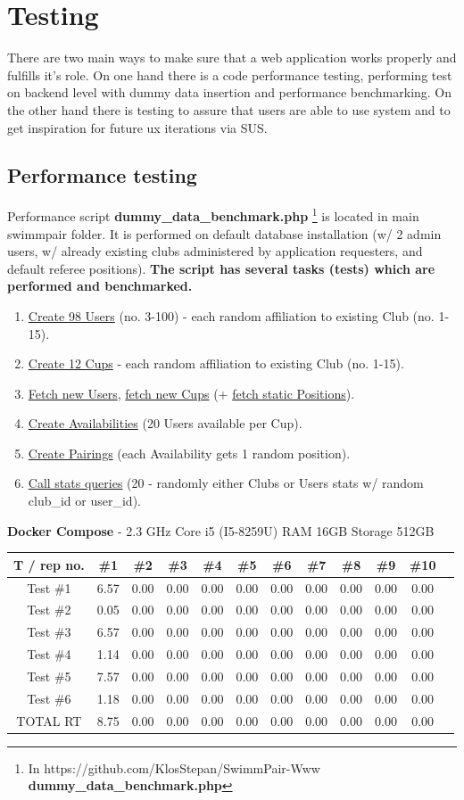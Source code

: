 \chapter{Testing}
There are two main ways to make sure that a web application works properly and fulfills it's role. On one hand there is a code performance testing, performing test on backend level with dummy data insertion and performance benchmarking. On the other hand there is testing to assure that users are able to use system and to get inspiration for future ux iterations via SUS.
\section{Performance testing}
Performance script \textbf{dummy\_data\_benchmark.php} \footnote{In https://github.com/KlosStepan/SwimmPair-Www \textbf{dummy\_data\_benchmark.php}} is located in main swimmpair folder. It is performed on default database installation (w/ 2 admin users, w/ already existing clubs administered by application requesters, and default referee positions).  
\newline
\textbf{The script has several tasks (tests) which are performed and benchmarked.}
\begin{enumerate}
    \item \underline{Create 98 Users} (no. 3-100) - each random affiliation to existing Club (no. 1-15).
    \item \underline{Create 12 Cups} - each random affiliation to existing Club (no. 1-15).
    \item \underline{Fetch new Users}, \underline{fetch new Cups} (+ \underline{fetch static Positions}).
    \item \underline{Create Availabilities} (20 Users available per Cup).
    \item \underline{Create Pairings} (each Availability gets 1 random position).
    \item \underline{Call stats queries} (20 - randomly either Clubs or Users stats w/ random club\_id or user\_id).
\end{enumerate}
\textbf{Docker Compose} - 2.3 GHz Core i5 (I5-8259U) RAM 16GB Storage 512GB
\newline
\begin{tabular}{ |c|c|c|c|c|c|c|c|c|c|c|c| } 
    \hline
    T / rep no. & \#1 & \#2& \#3& \#4& \#5& \#6& \#7& \#8& \#9& \#10 \\
    \hline
    Test \#1 & 6.57 & 0.00& 0.00& 0.00& 0.00& 0.00& 0.00& 0.00& 0.00& 0.00 \\ 
    Test \#2 & 0.05 & 0.00& 0.00& 0.00& 0.00& 0.00& 0.00& 0.00& 0.00& 0.00 \\ 
    Test \#3 & 6.57 & 0.00& 0.00& 0.00& 0.00& 0.00& 0.00& 0.00& 0.00& 0.00 \\ 
    Test \#4 & 1.14 & 0.00& 0.00& 0.00& 0.00& 0.00& 0.00& 0.00& 0.00& 0.00 \\ 
    Test \#5 & 7.57 & 0.00& 0.00& 0.00& 0.00& 0.00& 0.00& 0.00& 0.00& 0.00 \\ 
    Test \#6 & 1.18 & 0.00& 0.00& 0.00& 0.00& 0.00& 0.00& 0.00& 0.00& 0.00 \\ 
    TOTAL RT & 8.75 & 0.00& 0.00& 0.00& 0.00& 0.00& 0.00& 0.00& 0.00& 0.00 \\ 
    \hline
\end{tabular}
